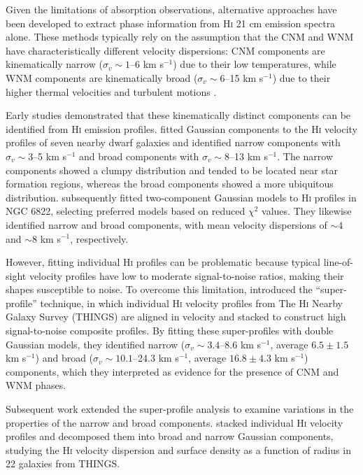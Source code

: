 Given the limitations of absorption observations, alternative approaches have been developed to extract phase information from \textrm{H\textsc{i}} 21 cm emission spectra alone. These methods typically rely on the assumption that the CNM and WNM have characteristically different velocity dispersions: CNM components are kinematically narrow ($\sigma_v \sim 1$--6 km s$^{-1}$) due to their low temperatures, while WNM components are kinematically broad ($\sigma_v \sim 6$--15 km s$^{-1}$) due to their higher thermal velocities and turbulent motions \citep{Young2003, deBlok2006, Ianjamasimanana2012}.\\\indent

Early studies demonstrated that these kinematically distinct components can be identified from \textrm{H\textsc{i}} emission profiles. \citet{Young2003} fitted Gaussian components to the \textrm{H\textsc{i}} velocity profiles of seven nearby dwarf galaxies and identified narrow components with $\sigma_v \sim 3$--5 km s$^{-1}$ and broad components with $\sigma_v \sim 8$--13 km s$^{-1}$. The narrow components showed a clumpy distribution and tended to be located near star formation regions, whereas the broad components showed a more ubiquitous distribution. \citet{deBlok2006} subsequently fitted two-component Gaussian models to \textrm{H\textsc{i}} profiles in NGC 6822, selecting preferred models based on reduced $\chi^2$ values. They likewise identified narrow and broad components, with mean velocity dispersions of $\sim4$ and $\sim8$ km s$^{-1}$, respectively.\\\indent

However, fitting individual \textrm{H\textsc{i}} profiles can be problematic because typical line-of-sight velocity profiles have low to moderate signal-to-noise ratios, making their shapes susceptible to noise. To overcome this limitation, \citet{Ianjamasimanana2012} introduced the ``super-profile'' technique, in which individual \textrm{H\textsc{i}} velocity profiles from The \textrm{H\textsc{i}} Nearby Galaxy Survey (THINGS) are aligned in velocity and stacked to construct high signal-to-noise composite profiles. By fitting these super-profiles with double Gaussian models, they identified narrow ($\sigma_v \sim 3.4$--8.6 km s$^{-1}$, average $6.5\pm1.5$ km s$^{-1}$) and broad ($\sigma_v \sim 10.1$--24.3 km s$^{-1}$, average $16.8\pm4.3$ km s$^{-1}$) components, which they interpreted as evidence for the presence of CNM and WNM phases.\\\indent

Subsequent work extended the super-profile analysis to examine variations in the properties of the narrow and broad components. \citet{Ianjamasimanana2015} stacked individual \textrm{H\textsc{i}} velocity profiles and decomposed them into broad and narrow Gaussian components, studying the \textrm{H\textsc{i}} velocity dispersion and surface density as a function of radius in 22 galaxies from THINGS.\\\indent

